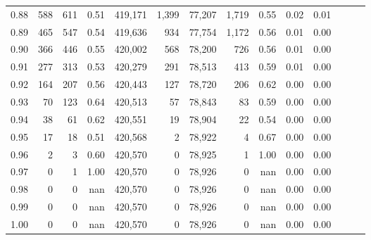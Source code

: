 \begin{tabular}{rrrrrrrrrrrrrr}
0.88 &     588 &    611 &  0.51 &  419,171 &    1,399 &  77,207 &   1,719 &  0.55 &  0.02 &      0.01 \\
0.89 &     465 &    547 &  0.54 &  419,636 &      934 &  77,754 &   1,172 &  0.56 &  0.01 &      0.00 \\
0.90 &     366 &    446 &  0.55 &  420,002 &      568 &  78,200 &     726 &  0.56 &  0.01 &      0.00 \\
0.91 &     277 &    313 &  0.53 &  420,279 &      291 &  78,513 &     413 &  0.59 &  0.01 &      0.00 \\
0.92 &     164 &    207 &  0.56 &  420,443 &      127 &  78,720 &     206 &  0.62 &  0.00 &      0.00 \\
0.93 &      70 &    123 &  0.64 &  420,513 &       57 &  78,843 &      83 &  0.59 &  0.00 &      0.00 \\
0.94 &      38 &     61 &  0.62 &  420,551 &       19 &  78,904 &      22 &  0.54 &  0.00 &      0.00 \\
0.95 &      17 &     18 &  0.51 &  420,568 &        2 &  78,922 &       4 &  0.67 &  0.00 &      0.00 \\
0.96 &       2 &      3 &  0.60 &  420,570 &        0 &  78,925 &       1 &  1.00 &  0.00 &      0.00 \\
0.97 &       0 &      1 &  1.00 &  420,570 &        0 &  78,926 &       0 &   nan &  0.00 &      0.00 \\
0.98 &       0 &      0 &   nan &  420,570 &        0 &  78,926 &       0 &   nan &  0.00 &      0.00 \\
0.99 &       0 &      0 &   nan &  420,570 &        0 &  78,926 &       0 &   nan &  0.00 &      0.00 \\
1.00 &       0 &      0 &   nan &  420,570 &        0 &  78,926 &       0 &   nan &  0.00 &      0.00 \\
\bottomrule
\end{tabular}
